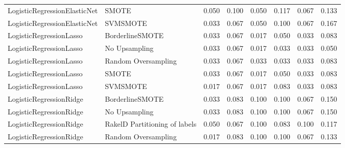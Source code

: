 \begin{tabular}{llllllll}
   LogisticRegressionElasticNet &                         SMOTE & 0.050 &                     0.100 &                 0.050 &                  0.117 &                                   0.067 &    0.133 \\
   LogisticRegressionElasticNet &                      SVMSMOTE & 0.033 &                     0.067 &                 0.050 &                  0.100 &                                   0.067 &    0.167 \\
        LogisticRegressionLasso &               BorderlineSMOTE & 0.033 &                     0.067 &                 0.017 &                  0.050 &                                   0.033 &    0.083 \\
        LogisticRegressionLasso &                 No Upsampling & 0.033 &                     0.067 &                 0.017 &                  0.033 &                                   0.033 &    0.050 \\
        LogisticRegressionLasso &           Random Oversampling & 0.033 &                     0.067 &                 0.033 &                  0.033 &                                   0.033 &    0.083 \\
        LogisticRegressionLasso &                         SMOTE & 0.033 &                     0.067 &                 0.017 &                  0.050 &                                   0.033 &    0.083 \\
        LogisticRegressionLasso &                      SVMSMOTE & 0.017 &                     0.067 &                 0.017 &                  0.083 &                                   0.033 &    0.083 \\
        LogisticRegressionRidge &               BorderlineSMOTE & 0.033 &                     0.083 &                 0.100 &                  0.100 &                                   0.067 &    0.150 \\
        LogisticRegressionRidge &                 No Upsampling & 0.033 &                     0.083 &                 0.100 &                  0.100 &                                   0.067 &    0.150 \\
        LogisticRegressionRidge & RakelD Partitioning of labels & 0.050 &                     0.067 &                 0.100 &                  0.083 &                                   0.100 &    0.117 \\
        LogisticRegressionRidge &           Random Oversampling & 0.017 &                     0.083 &                 0.100 &                  0.100 &                                   0.067 &    0.133 \\

\end{tabular}
